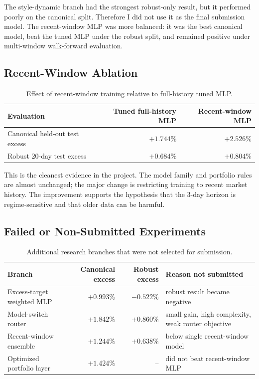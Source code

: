 \documentclass[11pt]{article}
\begin{document}
The style-dynamic branch had the strongest robust-only result, but it performed
poorly on the canonical split. Therefore I did not use it as the final
submission model. The recent-window MLP was more balanced: it was the best
canonical model, beat the tuned MLP under the robust split, and remained
positive under multi-window walk-forward evaluation.

\subsection{Recent-Window Ablation}

\begin{table}[h]
\centering
\caption{Effect of recent-window training relative to full-history tuned MLP.}
\begin{tabular}{lrr}
\toprule
Evaluation & Tuned full-history MLP & Recent-window MLP \\
\midrule
Canonical held-out test excess & \(+1.744\%\) & \(\mathbf{+2.526\%}\) \\
Robust 20-day test excess & \(+0.684\%\) & \(\mathbf{+0.804\%}\) \\
\bottomrule
\end{tabular}
\end{table}

This is the cleanest evidence in the project. The model family and portfolio
rules are almost unchanged; the major change is restricting training to recent
market history. The improvement supports the hypothesis that the 3-day horizon
is regime-sensitive and that older data can be harmful.

\subsection{Failed or Non-Submitted Experiments}

\begin{table}[h]
\centering
\caption{Additional research branches that were not selected for submission.}
\begin{tabular}{p{}rrp{}}
\toprule
Branch & Canonical excess & Robust excess & Reason not submitted \\
\midrule
Excess-target weighted MLP & \(+0.993\%\) & \(-0.522\%\) & robust result became negative \\
Model-switch router & \(+1.842\%\) & \(+0.860\%\) & small gain, high complexity, weak router objective \\
Recent-window ensemble & \(+1.244\%\) & \(+0.638\%\) & below single recent-window model \\
Optimized portfolio layer & \(+1.424\%\) & -- & did not beat recent-window MLP \\
\bottomrule
\end{tabular}
\end{table}
\end{document}
